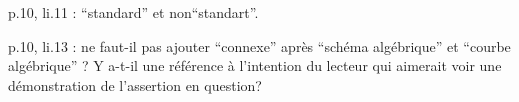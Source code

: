 p.10, li.11 : ``standard'' et non``standart''.

p.10, li.13 : ne faut-il pas ajouter ``connexe'' après ``schéma algébrique'' et ``courbe algébrique'' ? Y a-t-il une référence à l'intention du lecteur qui aimerait voir une démonstration de l'assertion en question?

